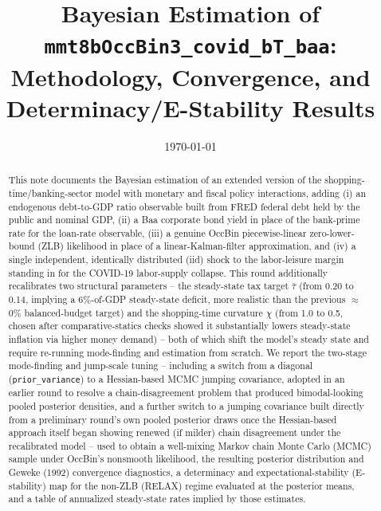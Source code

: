 \documentclass[11pt]{article}
\title{Bayesian Estimation of \texttt{mmt8bOccBin3\_covid\_bT\_baa}:\\
Methodology, Convergence, and Determinacy/E-Stability Results}
\author{}
\date{\today}
\begin{document}
\maketitle

\begin{abstract}
This note documents the Bayesian estimation of an extended version of the
shopping-time/banking-sector model with monetary and fiscal policy
interactions, adding (i) an endogenous debt-to-GDP ratio observable built
from FRED federal debt held by the public and nominal GDP, (ii) a Baa
corporate bond yield in place of the bank-prime rate for the loan-rate
observable, (iii) a genuine OccBin piecewise-linear zero-lower-bound
(ZLB) likelihood in place of a linear-Kalman-filter approximation, and
(iv) a single independent, identically distributed (iid) shock to the
labor-leisure margin standing in for the COVID-19 labor-supply collapse.
This round additionally recalibrates two structural parameters --
the steady-state tax target $\bar\tau$ (from 0.20 to 0.14, implying a
6\%-of-GDP steady-state deficit, more realistic than the previous
$\approx$0\% balanced-budget target) and the shopping-time curvature
$\chi$ (from 1.0 to 0.5, chosen after comparative-statics checks showed
it substantially lowers steady-state inflation via higher money demand)
-- both of which shift the model's steady state and require re-running
mode-finding and estimation from scratch. We report the two-stage
mode-finding and jump-scale tuning -- including a switch from a diagonal
(\texttt{prior\_variance}) to a Hessian-based MCMC jumping covariance,
adopted in an earlier round to resolve a chain-disagreement problem that
produced bimodal-looking pooled posterior densities, and a further
switch to a jumping covariance built directly from a preliminary round's
own pooled posterior draws once the Hessian-based approach itself began
showing renewed (if milder) chain disagreement under the recalibrated
model -- used to obtain a well-mixing Markov chain Monte Carlo (MCMC)
sample under OccBin's nonsmooth likelihood, the resulting posterior
distribution and Geweke
(1992) convergence diagnostics, a determinacy and
expectational-stability (E-stability) map for the non-ZLB (RELAX) regime
evaluated at the posterior means, and a table of annualized steady-state
rates implied by those estimates.


\end{abstract}
\end{document}
